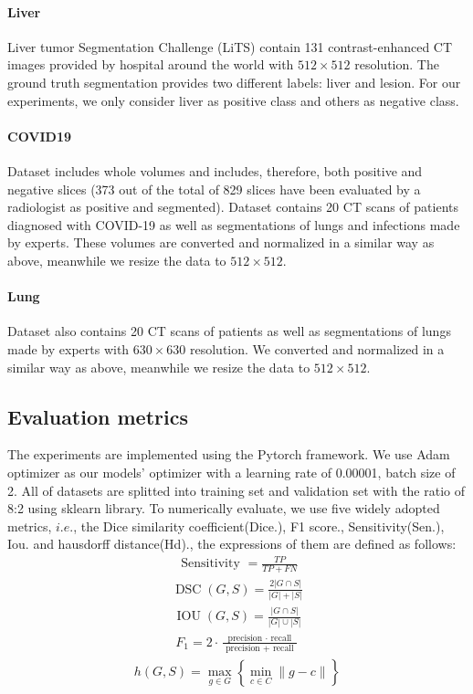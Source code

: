 \documentclass[UTF8]{article} %
\begin{document}
\paragraph{Liver}
Liver tumor Segmentation Challenge (LiTS)\cite{liver} contain 131 contrast-enhanced CT images provided by hospital around the world with \(512 \times 512\) resolution.
The ground truth segmentation provides two different labels: liver and lesion. For our experiments,
we only consider liver as positive class and others as negative class.


\paragraph{COVID19}
Dataset\cite{covid19} includes whole volumes and includes, therefore, both positive and negative slices 
(373 out of the total of 829 slices have been evaluated by a radiologist as positive and segmented). 
Dataset\cite{covid19_2} contains 20 CT scans of patients diagnosed with COVID-19 as well as segmentations of lungs and infections made by experts.
These volumes are converted and normalized in a similar way as above, meanwhile we resize the data to $512\times 512$.

\paragraph{Lung}
Dataset\cite{covid19_2} also contains 20 CT scans of patients as well as segmentations of lungs made by experts with \(630 \times 630\) resolution.
We converted and normalized in a similar way as above, meanwhile we resize the data to $512\times 512$.

\subsection{Evaluation metrics}
The experiments are implemented using the Pytorch framework. We use Adam optimizer\cite{Adam} as our
models' optimizer with a learning rate of 0.00001, batch size of 2. All of datasets are splitted into training set and validation set with 
the ratio of 8:2 using sklearn library. To numerically evaluate, we use five widely adopted metrics, \(i.e.\),
the Dice similarity coefficient(Dice.), F1 score., Sensitivity(Sen.), Iou. and hausdorff distance(Hd)., the expressions of them are defined as follows:
\begin{align}
  \text { Sensitivity }=\frac{T P}{T P+F N}
\end{align}
\begin{align}
  \operatorname{DSC}(G, S)=\frac{2|G \cap S|}{|G|+|S|}
\end{align}
\begin{align}
  \operatorname{IOU}(G, S)=\frac{|G \cap S|}{|G| \cup|S|}
\end{align}
\begin{align}
  F_{1}=2 \cdot \frac{\text { precision } \cdot \text { recall }}{\text { precision }+\text { recall }}
\end{align}
\begin{align}
  h(G, S)=\max _{g \in G}\left\{\min _{c \in C}\|g-c\|\right\}
\end{align}
\end{document}

